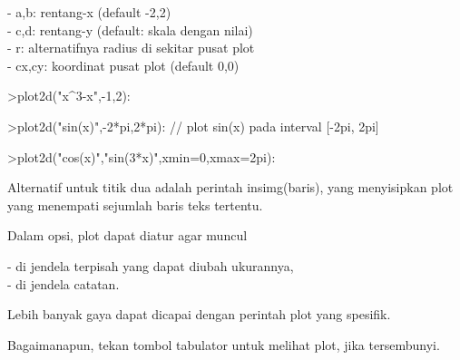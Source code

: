 \documentclass[a4paper,10pt]{article}
\begin{document}
\begin{eulernotebook}
\begin{eulercomment}
\begin{eulercomment}
\begin{eulercomment}
\begin{eulercomment}
\begin{eulercomment}
\begin{eulercomment}
\begin{eulercomment}
\begin{eulercomment}
\begin{eulercomment}
\begin{eulercomment}
\begin{eulercomment}
- a,b: rentang-x (default -2,2)\\
- c,d: rentang-y (default: skala dengan nilai)\\
- r: alternatifnya radius di sekitar pusat plot\\
- cx,cy: koordinat pusat plot (default 0,0)
\end{eulercomment}
\begin{eulerprompt}
>plot2d("x^3-x",-1,2):
\end{eulerprompt}
\begin{eulerprompt}
>plot2d("sin(x)",-2*pi,2*pi): // plot sin(x) pada interval [-2pi, 2pi]
\end{eulerprompt}
\begin{eulerprompt}
>plot2d("cos(x)","sin(3*x)",xmin=0,xmax=2pi):
\end{eulerprompt}
\begin{eulercomment}
Alternatif untuk titik dua adalah perintah insimg(baris), yang
menyisipkan plot yang menempati sejumlah baris teks tertentu.

Dalam opsi, plot dapat diatur agar muncul

- di jendela terpisah yang dapat diubah ukurannya,\\
- di jendela catatan.


Lebih banyak gaya dapat dicapai dengan perintah plot yang spesifik.

Bagaimanapun, tekan tombol tabulator untuk melihat plot, jika
tersembunyi.


\end{eulercomment}
\end{eulercomment}
\end{eulercomment}
\end{eulercomment}
\end{eulercomment}
\end{eulercomment}
\end{eulercomment}
\end{eulercomment}
\end{eulercomment}
\end{eulercomment}
\end{eulercomment}
\end{eulernotebook}
\end{document}
